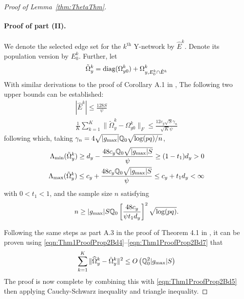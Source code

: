\begin{proof}[Proof of Lemma~\ref{thm:ThetaThm}]
\paragraph{Proof of part (II).}
We denote the selected edge set for the $k^\text{th}$ Y-network by $\hat E^k$. Denote its population version by $E_0^k$. Further, let
%
$$
\tilde \Omega_y^k = \operatorname*{diag} (\Omega_{y0}^k) + \Omega_{y, E_0^k \cap \hat E^k}^k
$$
%
With similar derivations to the proof of Corollary A.1 in \cite{MaMichailidis15}, The following two upper bounds can be established:
%
\begin{align}
| \hat E^k | \leq \frac{ 128 S }{\psi} \label{eqn:Thm1ProofProp2Bd4}\\
\frac{1}{K} \sum_{k=1}^K \| \tilde \Omega_y^k - \Omega_{y0}^k \|_F \leq
\frac{12 c_y \sqrt{S} \gamma_n} {\sqrt K \psi} \label{eqn:Thm1ProofProp2Bd5}
\end{align}
%
following which, taking $\gamma_n = 4 \sqrt{| g_{\max}|} {\mathbb{Q}}_0 \sqrt{ \log (pq)/ n}$,
%
\begin{align}
\Lambda_{\min} ( \tilde \Omega_y^k) \geq d_y - \frac{48 c_y {\mathbb{Q}}_0 \sqrt{| g_{\max}| S}}{ \psi} \geq (1 - t_1) d_y > 0 \label{eqn:Thm1ProofProp2Bd6}\\
\Lambda_{\max} ( \tilde \Omega_y^k) \leq c_y + \frac{48 c_y {\mathbb{Q}}_0 \sqrt{| g_{\max}| S}}{ \psi} \leq c_y + t_1 d_y < \infty \label{eqn:Thm1ProofProp2Bd7}
\end{align}
%
with $0 < t_1 < 1$, and the sample size $n$ satisfying
%
$$
n \geq | g_{\max}| S {\mathbb{Q}}_0 \left[ \frac{48 c_y}{\psi t_1 d_y} \right]^2 \sqrt{ \log (pq)}.
$$

Following the same steps as part A.3 in the proof of Theorem 4.1 in \cite{MaMichailidis15}, it can be proven using \eqref{eqn:Thm1ProofProp2Bd4}--\eqref{eqn:Thm1ProofProp2Bd7} that
%
$$
\sum_{k=1}^K \| \widehat \Omega_y^k - \tilde \Omega_y^k \|^2 \leq O \left( {\mathbb{Q}}_0^2 | g_{\max}| S \right)
$$
%
The proof is now complete by combining this with \eqref{eqn:Thm1ProofProp2Bd5} then applying Cauchy-Schwarz inequality and triangle inequality.
\end{proof}

